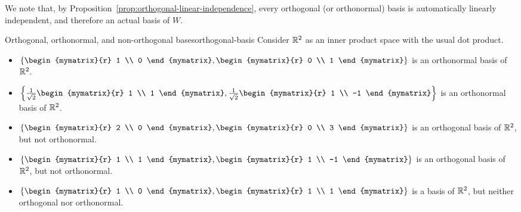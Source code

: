 We note that, by
Proposition~\ref{prop:orthogonal-linear-independence}, every
orthogonal (or orthonormal) basis is automatically linearly
independent, and therefore an actual basis of $W$.

\begin{example}{Orthogonal, orthonormal, and non-orthogonal bases}{orthogonal-basis}
  Consider $\mathbb{R}^2$ as an inner product space with the usual dot product.
  \begin{itemize}
  \item $\set{\begin{mymatrix}{r} 1 \\ 0 \end{mymatrix},
      \begin{mymatrix}{r} 0 \\ 1 \end{mymatrix}}$ is an orthonormal
    basis of $\mathbb{R}^2$.
  \item
    $\set{\frac{1}{\sqrt{2}}\begin{mymatrix}{r} 1 \\ 1 \end{mymatrix},
      \frac{1}{\sqrt{2}}\begin{mymatrix}{r} 1 \\ -1 \end{mymatrix}}$
    is an orthonormal basis of $\mathbb{R}^2$.
  \item $\set{\begin{mymatrix}{r} 2 \\ 0 \end{mymatrix},
      \begin{mymatrix}{r} 0 \\ 3 \end{mymatrix}}$ is an orthogonal
    basis of $\mathbb{R}^2$, but not orthonormal.
  \item $\set{\begin{mymatrix}{r} 1 \\ 1 \end{mymatrix},
      \begin{mymatrix}{r} 1 \\ -1 \end{mymatrix}}$ is an orthogonal
    basis of $\mathbb{R}^2$, but not orthonormal.
  \item $\set{\begin{mymatrix}{r} 1 \\ 0 \end{mymatrix},
      \begin{mymatrix}{r} 1 \\ 1 \end{mymatrix}}$ is a basis of
    $\mathbb{R}^2$, but neither orthogonal nor orthonormal.
  \end{itemize}
\end{example}


